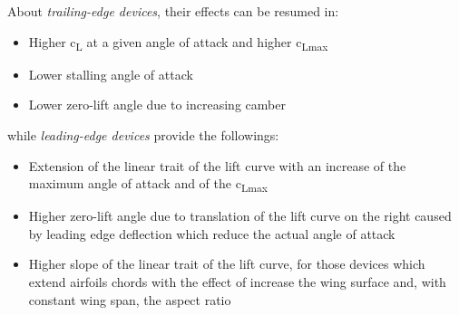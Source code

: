 \bigskip
\noindent
About \emph{trailing-edge devices}, their effects can be resumed in:
%
\begin{itemize}
\item Higher c\textsubscript{L} at a given angle of attack and higher c\textsubscript{Lmax}
\item Lower stalling angle of attack
\item Lower zero-lift angle due to increasing camber
\end{itemize}
%
\noindent
while \emph{leading-edge devices} provide the followings:
\begin{itemize}
\item Extension of the linear trait of the lift curve with an increase of the maximum angle of attack and of the c\textsubscript{Lmax}
\item Higher zero-lift angle due to translation of the lift curve on the right caused by leading edge deflection which reduce the actual angle of attack 
\item Higher slope of the linear trait of the lift curve, for those devices which extend airfoils chords with the effect of increase the wing surface and, with constant wing span, the aspect ratio
\end{itemize}
%
